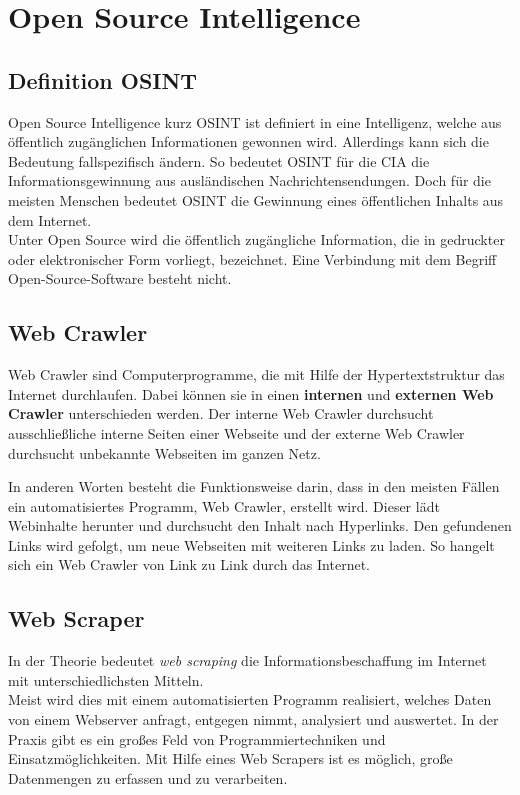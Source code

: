 \section{Open Source Intelligence}
	\subsection{Definition OSINT}
	Open Source Intelligence kurz OSINT ist definiert in eine Intelligenz, welche aus öffentlich zugänglichen Informationen gewonnen wird. Allerdings kann sich die Bedeutung fallspezifisch ändern. So bedeutet OSINT für die CIA die Informationsgewinnung aus ausländischen Nachrichtensendungen. Doch für die meisten Menschen bedeutet OSINT die Gewinnung eines öffentlichen Inhalts aus dem Internet. \cite{Bazzell}\\
	Unter Open Source wird die öffentlich zugängliche Information, die in gedruckter oder elektronischer Form vorliegt, bezeichnet.\cite{steele1996open} Eine Verbindung mit dem Begriff Open-Source-Software besteht nicht.
	\subsection{Web Crawler}
		Web Crawler sind Computerprogramme, die mit Hilfe der Hypertextstruktur das Internet durchlaufen. Dabei können sie in einen \textbf{internen} und \textbf{externen Web Crawler} unterschieden werden. Der interne Web Crawler durchsucht ausschließliche interne Seiten einer Webseite und der externe Web Crawler durchsucht unbekannte Webseiten im ganzen Netz. \cite{sharma2012study}

		In anderen Worten besteht die Funktionsweise darin, dass in den meisten Fällen ein automatisiertes Programm, Web Crawler, erstellt wird. Dieser lädt Webinhalte herunter und durchsucht den Inhalt nach Hyperlinks. Den gefundenen Links wird gefolgt, um neue Webseiten mit weiteren Links zu laden. So hangelt sich ein Web Crawler von Link zu Link durch das Internet.\cite{WebScraping}
		
	\subsection{Web Scraper}
		In der Theorie bedeutet \textit{web scraping} die Informationsbeschaffung im Internet mit unterschiedlichsten Mitteln. \cite{WebScraping}\\		
		Meist wird dies mit einem automatisierten Programm realisiert, welches Daten von einem Webserver anfragt, entgegen nimmt, analysiert und auswertet. 
		In der Praxis gibt es ein großes Feld von Programmiertechniken und Einsatzmöglichkeiten.
		Mit Hilfe eines Web Scrapers ist es möglich, große Datenmengen zu erfassen und zu verarbeiten.\cite{WebScraping}

